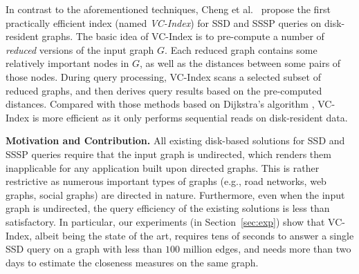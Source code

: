 \documentclass{sig-alternate}
\def\header{\vspace{2mm} \noindent}
\def\vgap{\vspace{0mm}}
\begin{document}
\begin{sloppy}
\vgap

In contrast to the aforementioned techniques, Cheng et al.\ \cite{ckcc12} propose the first practically efficient index (named {\em VC-Index}) for SSD and SSSP queries on disk-resident graphs. The basic idea of VC-Index is to pre-compute a number of {\em reduced} versions of the input graph $G$. Each reduced graph contains some relatively important nodes in $G$, as well as the distances between some pairs of those nodes. During query processing, VC-Index scans a selected subset of reduced graphs, and then derives query results based on the pre-computed distances. Compared with those methods based on Dijkstra's algorithm \cite{mo09,mz03,mz12,m09,ks96}, VC-Index is more efficient as it only performs sequential reads on disk-resident data.

\vgap

\header
{\bf Motivation and Contribution.} All existing disk-based solutions for SSD and SSSP queries \cite{mo09,mz03,mz12,m09,ks96} require that the input graph is undirected, which renders them inapplicable for any application built upon directed graphs. This is rather restrictive as numerous important types of graphs (e.g., road networks, web graphs, social graphs) are directed in nature. Furthermore, even when the input graph is undirected, the query efficiency of the existing solutions is less than satisfactory. In particular, our experiments (in Section~\ref{sec:exp}) show that VC-Index, albeit being the state of the art, requires tens of seconds to answer a single SSD query on a graph with less than $100$ million edges, and needs more than two days to estimate the closeness measures on the same graph.



\end{sloppy}
\end{document}
